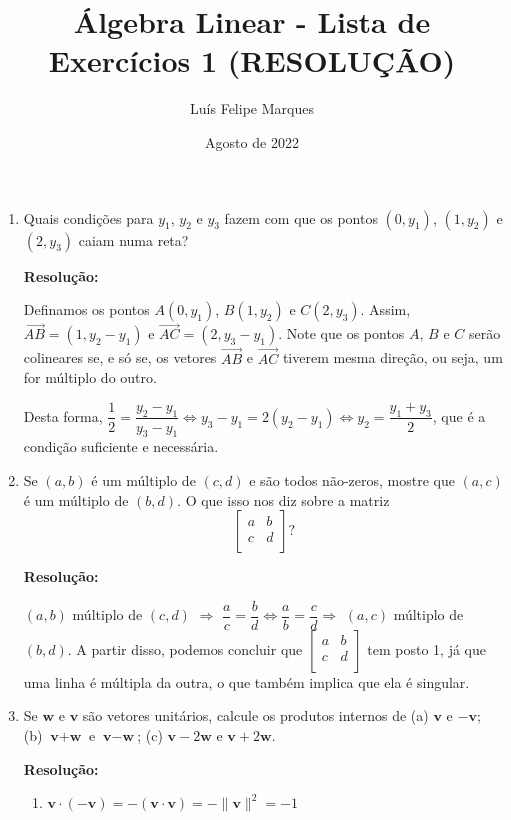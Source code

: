 \documentclass[leqno]{article}
\title{Álgebra Linear - Lista de Exercícios 1 (RESOLUÇÃO)}
\author{Luís Felipe Marques}
\date{Agosto de 2022}
\begin{document}
 
\maketitle

\begin{enumerate}
    \item Quais condições para $y_1$, $y_2$ e $y_3$ fazem com que os pontos $(0, y_1)$, $(1, y_2)$ e $(2, y_3)$ caiam numa reta?
    
    \textbf{Resolução:}

    Definamos os pontos $A(0,y_1)$, $B(1,y_2)$ e $C(2,y_3)$. Assim, $\Vec{AB}=(1,y_2-y_1)$ e $\Vec{AC}=(2,y_3-y_1)$. Note que os pontos $A$, $B$ e $C$ serão colineares se, e só se, os vetores $\Vec{AB}$ e $\Vec{AC}$ tiverem mesma direção, ou seja, um for múltiplo do outro.
    
    Desta forma, $\dfrac{1}{2}=\dfrac{y_2-y_1}{y_3-y_1}\iff y_3-y_1=2(y_2-y_1)\iff y_2=\dfrac{y_1+y_3}{2}$, que é a condição suficiente e necessária.
    
    \item Se $(a, b)$ é um múltiplo de $(c, d)$ e são todos não-zeros, mostre que $(a, c)$ é um múltiplo de $(b, d)$. O que isso nos diz sobre a matriz
    $$\begin{bmatrix}a&b\\c&d\\ \end{bmatrix}\text{?}$$
    
    \textbf{Resolução:}

    $(a,b)$ múltiplo de $(c,d)$ $\Rightarrow$ $\dfrac{a}{c}=\dfrac{b}{d}\iff \dfrac{a}{b}=\dfrac{c}{d}\Rightarrow$ $(a,c)$ múltiplo de $(b,d)$. A partir disso, podemos concluir que $\begin{bmatrix}a & b\\c & d\\ \end{bmatrix}$ tem posto 1, já que uma linha é múltipla da outra, o que também implica que ela é singular.
    
    \item Se $\textbf{w}$ e $\textbf{v}$ são vetores unitários, calcule os produtos internos de (a) $\textbf{v}$ e $-\textbf{v}$; (b) $\textbf{v} + \textbf{w}$ e $\textbf{v} - \textbf{w}$; (c) $\textbf{v} -2\textbf{w}$ e $\textbf{v} + 2\textbf{w}$.
    
    \textbf{Resolução:}
    
    \begin{enumerate}
        \item $\textbf{v}\cdot(-\textbf{v})=-(\textbf{v}\cdot\textbf{v})=-\lVert \textbf{v}\rVert^2=-1$
        

\end{enumerate}
\end{enumerate}
\end{document}
